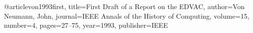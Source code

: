 @article{von1993first,
  title={First Draft of a Report on the EDVAC},
  author={Von Neumann, John},
  journal={IEEE Annals of the History of Computing},
  volume={15},
  number={4},
  pages={27--75},
  year={1993},
  publisher={IEEE}
}